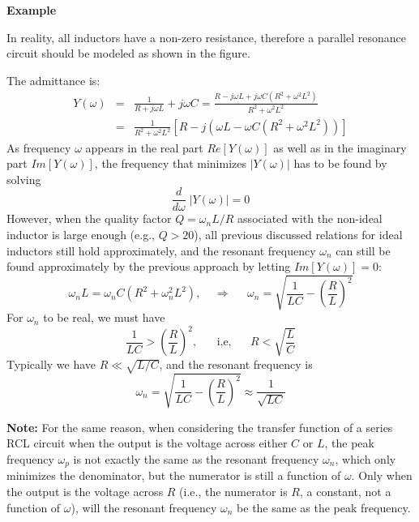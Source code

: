 \documentclass{article}
\begin{document}
{\bf Example} 

In reality, all inductors have a non-zero resistance, therefore a 
parallel resonance circuit should be modeled as shown in the figure.


The admittance is:
\begin{eqnarray}
  Y(\omega)&=&\frac{1}{R+j\omega L}+j\omega C
  =\frac{R-j\omega L+j\omega C(R^2+\omega^2L^2)}{R^2+\omega^2L^2}
  \nonumber \\
  &=&\frac{1}{R^2+\omega^2L^2}[R-j(\omega L-\omega C(R^2+\omega^2L^2))]
\end{eqnarray}
As frequency $\omega$ appears in the real part $Re[Y(\omega)]$ as well 
as in the imaginary part $Im[Y(\omega)]$, the frequency that minimizes 
$|Y(\omega)|$ has to be found by solving
\begin{equation}
  \frac{d}{d\omega} \; |Y(\omega)| =0 	
\end{equation}
However, when the quality factor $Q=\omega_n L/R$ associated with the
non-ideal inductor is large enough (e.g., $Q > 20$), all previous discussed 
relations for ideal inductors still hold approximately, and the resonant 
frequency $\omega_n$ can still be found approximately by the previous 
approach by letting $Im[Y(\omega)]=0$: 
\begin{equation}
  \omega_n L=\omega_n C(R^2+\omega_n^2L^2),\;\;\;\;\Longrightarrow
  \;\;\;\;\;\omega_n=\sqrt{\frac{1}{LC}-\left(\frac{R}{L}\right)^2}	
\end{equation}
For $\omega_n$ to be real, we must have
\begin{equation}
  \frac{1}{LC} > (\frac{R}{L})^2, \;\;\;\;\;\;\mbox{i,e,}
  \;\;\;\;\;\;R<\sqrt{\frac{L}{C}}	
\end{equation}
Typically we have $R \ll \sqrt{L/C}$, and the resonant frequency is
\begin{equation}
  \omega_n=\sqrt{\frac{1}{LC}-\left(\frac{R}{L}\right)^2}\approx \frac{1}{\sqrt{LC}}
\end{equation}

{\bf Note: } For the same reason, when considering the transfer function
of a series RCL circuit when the output is the voltage across either $C$
or $L$, the peak frequency $\omega_p$ is not exactly the same as the 
resonant frequency $\omega_n$, which only minimizes the denominator, but
the numerator is still a function of $\omega$. Only when the output is 
the voltage across $R$ (i.e., the numerator is $R$, a constant, not a 
function of $\omega$), will the resonant frequency $\omega_n$ be the same 
as the peak frequency.
\end{document}
